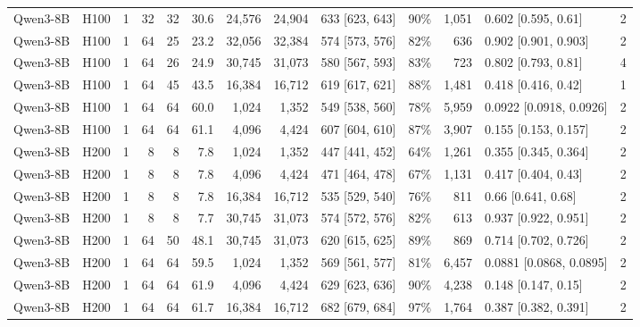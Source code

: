 \begin{landscape}
\begin{longtable}{llrrrrrrlrrlr}
Qwen3-8B & H100 & 1 & 32 & 32 & 30.6 & 24,576 & 24,904 & 633 {[}623, 643{]} & 90\% & 1,051 & 0.602 {[}0.595, 0.61{]} & 2 \\
Qwen3-8B & H100 & 1 & 64 & 25 & 23.2 & 32,056 & 32,384 & 574 {[}573, 576{]} & 82\% & 636 & 0.902 {[}0.901, 0.903{]} & 2 \\
Qwen3-8B & H100 & 1 & 64 & 26 & 24.9 & 30,745 & 31,073 & 580 {[}567, 593{]} & 83\% & 723 & 0.802 {[}0.793, 0.81{]} & 4 \\
Qwen3-8B & H100 & 1 & 64 & 45 & 43.5 & 16,384 & 16,712 & 619 {[}617, 621{]} & 88\% & 1,481 & 0.418 {[}0.416, 0.42{]} & 1 \\
Qwen3-8B & H100 & 1 & 64 & 64 & 60.0 & 1,024 & 1,352 & 549 {[}538, 560{]} & 78\% & 5,959 & 0.0922 {[}0.0918, 0.0926{]} & 2 \\
Qwen3-8B & H100 & 1 & 64 & 64 & 61.1 & 4,096 & 4,424 & 607 {[}604, 610{]} & 87\% & 3,907 & 0.155 {[}0.153, 0.157{]} & 2 \\
Qwen3-8B & H200 & 1 & 8 & 8 & 7.8 & 1,024 & 1,352 & 447 {[}441, 452{]} & 64\% & 1,261 & 0.355 {[}0.345, 0.364{]} & 2 \\
Qwen3-8B & H200 & 1 & 8 & 8 & 7.8 & 4,096 & 4,424 & 471 {[}464, 478{]} & 67\% & 1,131 & 0.417 {[}0.404, 0.43{]} & 2 \\
Qwen3-8B & H200 & 1 & 8 & 8 & 7.8 & 16,384 & 16,712 & 535 {[}529, 540{]} & 76\% & 811 & 0.66 {[}0.641, 0.68{]} & 2 \\
Qwen3-8B & H200 & 1 & 8 & 8 & 7.7 & 30,745 & 31,073 & 574 {[}572, 576{]} & 82\% & 613 & 0.937 {[}0.922, 0.951{]} & 2 \\
Qwen3-8B & H200 & 1 & 64 & 50 & 48.1 & 30,745 & 31,073 & 620 {[}615, 625{]} & 89\% & 869 & 0.714 {[}0.702, 0.726{]} & 2 \\
Qwen3-8B & H200 & 1 & 64 & 64 & 59.5 & 1,024 & 1,352 & 569 {[}561, 577{]} & 81\% & 6,457 & 0.0881 {[}0.0868, 0.0895{]} & 2 \\
Qwen3-8B & H200 & 1 & 64 & 64 & 61.9 & 4,096 & 4,424 & 629 {[}623, 636{]} & 90\% & 4,238 & 0.148 {[}0.147, 0.15{]} & 2 \\
Qwen3-8B & H200 & 1 & 64 & 64 & 61.7 & 16,384 & 16,712 & 682 {[}679, 684{]} & 97\% & 1,764 & 0.387 {[}0.382, 0.391{]} & 2 \\
\end{longtable}
\endgroup
\end{landscape}
\restoregeometry
